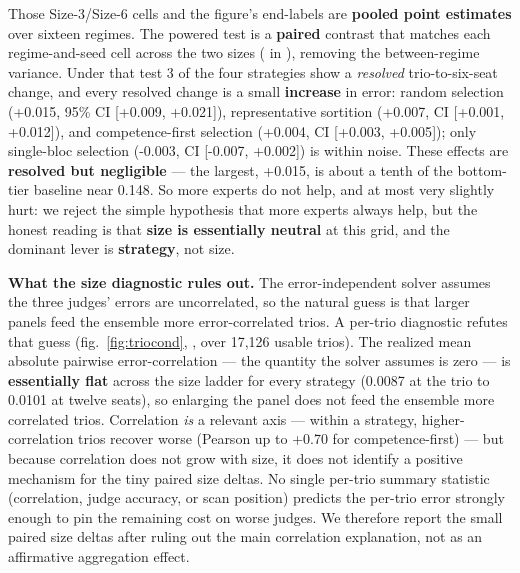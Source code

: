 \documentclass[
]{article}
\begin{document}
Those Size-3/Size-6 cells and the figure's end-labels are \textbf{pooled
point estimates} over sixteen regimes. The powered test is a
\textbf{paired} contrast that matches each regime-and-seed cell across
the two sizes ( in
), removing the
between-regime variance. Under that test 3 of the four strategies show a
\emph{resolved} trio-to-six-seat change, and every resolved change is a
small \textbf{increase} in error: random selection (+0.015, 95\% CI
{[}+0.009, +0.021{]}), representative sortition (+0.007, CI {[}+0.001,
+0.012{]}), and competence-first selection (+0.004, CI {[}+0.003,
+0.005{]}); only single-bloc selection (-0.003, CI {[}-0.007, +0.002{]})
is within noise. These effects are \textbf{resolved but negligible} ---
the largest, +0.015, is about a tenth of the bottom-tier baseline near
0.148. So more experts do not help, and at most very slightly hurt: we
reject the simple hypothesis that more experts always help, but the
honest reading is that \textbf{size is essentially neutral} at this
grid, and the dominant lever is \textbf{strategy}, not size.

\textbf{What the size diagnostic rules out.} The error-independent
solver assumes the three judges' errors are uncorrelated, so the natural
guess is that larger panels feed the ensemble more error-correlated
trios. A per-trio diagnostic refutes that guess
(fig.~\ref{fig:triocond},
, over 17,126 usable
trios). The realized mean absolute pairwise error-correlation --- the
quantity the solver assumes is zero --- is \textbf{essentially flat}
across the size ladder for every strategy (0.0087 at the trio to 0.0101
at twelve seats), so enlarging the panel does not feed the ensemble more
correlated trios. Correlation \emph{is} a relevant axis --- within a
strategy, higher-correlation trios recover worse (Pearson up to +0.70
for competence-first) --- but because correlation does not grow with
size, it does not identify a positive mechanism for the tiny paired size
deltas. No single per-trio summary statistic (correlation, judge
accuracy, or scan position) predicts the per-trio error strongly enough
to pin the remaining cost on worse judges. We therefore report the small
paired size deltas after ruling out the main correlation explanation,
not as an affirmative aggregation effect.
\end{document}
